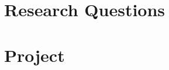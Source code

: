 \documentclass[11pt,a4paper,oneside,english]{article}
\begin{document}

\section[Research Questions]{Research Questions} \label{sec:research-questions}



\section[Project]{Project} \label{sec:project}



\end{document}
